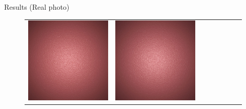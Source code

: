 \documentclass[final]{beamer}
\newlength{\twocolwid}
\newlength{\resultwidth}
\begin{document}
\begin{frame}[t]
\begin{columns}[t]
\begin{column}{\twocolwid}
\begin{block}{Results (Real photo)}
\begin{figure}[t]
\begin{tabular}{ccrclccc}
            		\includegraphics[width=\resultwidth]{images/real/bump/good2.jpg} &
            		\includegraphics[width=\resultwidth]{images/real/bump/good3.jpg} &

\end{tabular}
\end{figure}
\end{block}
\end{column}
\end{columns}
\end{frame}
\end{document}

